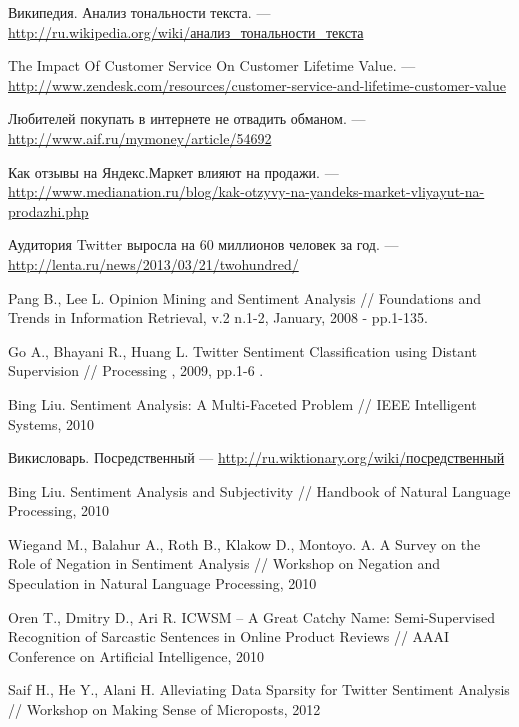 Википедия. Анализ тональности текста. --- \\
\href{http://ru.wikipedia.org/wiki/%D0%90%D0%BD%D0%B0%D0%BB%D0%B8%D0%B7_%D1%82%D0%BE%D0%BD%D0%B0%D0%BB%D1%8C%D0%BD%D0%BE%D1%81%D1%82%D0%B8_%D1%82%D0%B5%D0%BA%D1%81%D1%82%D0%B0}{http://ru.wikipedia.org/wiki/анализ\_тональности\_текста}

The Impact Of Customer Service On Customer Lifetime Value. --- \url{http://www.zendesk.com/resources/customer-service-and-lifetime-customer-value}

Любителей покупать в интернете не отвадить обманом. --- \url{http://www.aif.ru/mymoney/article/54692}

Как отзывы на Яндекс.Маркет влияют на продажи. --- \url{http://www.medianation.ru/blog/kak-otzyvy-na-yandeks-market-vliyayut-na-prodazhi.php}

Аудитория Twitter выросла на 60 миллионов человек за год. --- \url{http://lenta.ru/news/2013/03/21/twohundred/}

Pang B., Lee L. Opinion Mining and Sentiment Analysis // Foundations and 
Trends in Information Retrieval, v.2 n.1-2, January, 2008 - pp.1-135.

Go A., Bhayani R., Huang L. Twitter Sentiment Classification using Distant Supervision // Processing , 2009, pp.1-6 .

Bing Liu. Sentiment Analysis: A Multi-Faceted Problem // IEEE Intelligent Systems, 2010

Викисловарь. Посредственный --- \href{http://ru.wiktionary.org/wiki/%D0%BF%D0%BE%D1%81%D1%80%D0%B5%D0%B4%D1%81%D1%82%D0%B2%D0%B5%D0%BD%D0%BD%D1%8B%D0%B9}{http://ru.wiktionary.org/wiki/посредственный}

Bing Liu. Sentiment Analysis and Subjectivity // Handbook of Natural Language Processing, 2010

Wiegand M., Balahur A., Roth B., Klakow D., Montoyo. A. A Survey on the Role of Negation in Sentiment Analysis // Workshop on Negation and Speculation in Natural Language Processing, 2010

Oren T., Dmitry D., Ari R. ICWSM – A Great Catchy Name: Semi-Supervised Recognition of Sarcastic Sentences in Online Product Reviews // AAAI Conference on Artificial Intelligence, 2010 

Saif H., He Y., Alani H. Alleviating Data Sparsity for Twitter Sentiment Analysis // Workshop on Making Sense of Microposts, 2012

